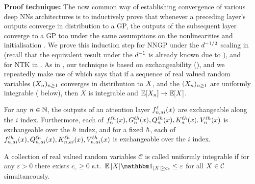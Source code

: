 \textbf{Proof technique:} The now common way of establishing convergence of various deep NNs architectures is to inductively prove that whenever a preceding layer's outputs converge in distribution to a GP, the outputs of the subsequent layer converge to a GP too under the same assumptions on the nonlinearities and initialisation \citep[e.g.,][]{matthews2018gaussian,lee2018deep,novak2019bayesian,garriga2019deep,yang2019v1,yang2019v2}.
We prove this induction step for NNGP under the $d^{-1/2}$ scaling in  (recall that the equivalent result under the $d^{-1}$ is already known due to \citet{yang2019v2}), and for NTK in .
As in \citep{matthews2018gaussian}, our technique is based on exchangeability (), and we repeatedly make use of  which says that if a sequence of real valued random variables $(X_n)_{n \geq 1}$ converges in distribution to $X$, and the $(X_n)_{n \geq 1}$ are uniformly integrable ( below), then $X$ is integrable and $\operatorname*{\mathbb{E}} [ X_{n} ] \to \operatorname*{\mathbb{E}} [ X ]$.


\begin{lemma}[Exchangeability]\label{lem:exchangeability}
    For any $n \in \mathbb{N}$, the outputs of an attention layer ${f}^{\ell}_{n, a i}{(x)}$ are exchangeable along the $i$ index.
    Furthermore, each of ${f}^{\ell h}_{n}{(x)}, G_{n}^{\ell h}(x), Q_{n}^{\ell h}(x), K_{n}^{\ell h}(x), V_{n}^{\ell h}(x)$ is exchangeable over the $h$ index, and for a fixed $h$, each of ${f}^{\ell h}_{n, a i}{(x)}, Q_{n, a i}^{\ell h}(x), K_{n, a i}^{\ell h}(x), V_{n, a i}^{\ell h}(x)$ is exchangeable over the $i$ index.
\end{lemma}



\begin{definition}\label{def:ui}
    A collection of real valued random variables $\mathcal{C}$ is called uniformly integrable if for any $\varepsilon > 0$ there exists $c_{\varepsilon} \geq 0$ s.t.\ $\E |\genericRV| \indicator{|\genericRV| \geq c_{\varepsilon}} \leq \varepsilon$ for all $X \in \mathcal{C}$ simultaneously.
\end{definition}


